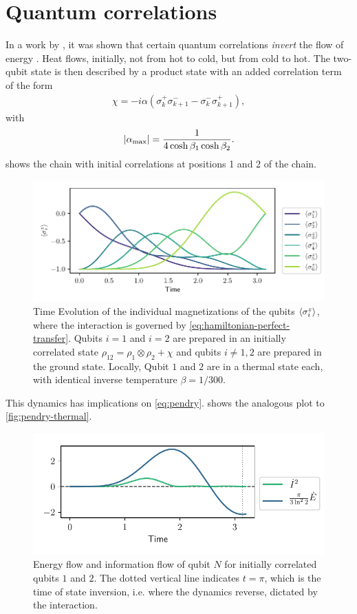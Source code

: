 \documentclass[a4paper,11pt]{scrartcl}
\begin{document}
\section{Quantum correlations}
In a work by \citeauthor{BA_kaonan_correlations}, it was shown that certain quantum correlations
\emph{invert} the flow of energy \cite{BA_kaonan_correlations}. Heat flows, initially, not from hot to cold, but
from cold to hot. The two-qubit state is then described by a product state with an added correlation term of the form
\begin{align}\label{eq:kaonans-corr}
    \chi = -i\alpha(\sigma^+_k \sigma^-_{k+1} - \sigma^-_k \sigma^+_{k+1}),
\end{align}
with 
\begin{align}\label{eq:alpha-max}
    \abs{\alpha_\text{max}} = \frac{1}{4\cosh\beta_1\cosh\beta_2}.
\end{align}
 shows the chain with initial correlations at positions 1 and 2 of the chain.
\begin{figure}[H]
    \centering
    \includegraphics{thermal-state-expval-z-corr.pdf}
    \caption{Time Evolution of the individual magnetizations of the qubits
    $\expval{\sigma^z_i}$, where the interaction is governed by \cref{eq:hamiltonian-perfect-transfer}.
    Qubits $i=1$ and $i=2$ are prepared in an initially correlated state $\rho_{12} = \rho_1 \otimes \rho_2 + \chi$
    and qubits $i\neq1,2$ are prepared in the ground state.
    Locally, Qubit $1$ and $2$ are in a thermal state each, with identical inverse temperature $\beta = 1/300$.}
    \label{fig:corr}
\end{figure}
This dynamics has implications on \cref{eq:pendry}.  shows the analogous plot to \cref{fig:pendry-thermal}.
\begin{figure}[H]
    \centering
    \includegraphics{12_penry_grey_lines_first_thermal.pdf}
    \caption{Energy flow  and information flow of qubit $N$ for 
    initially correlated qubits $1$ and $2$.
    The dotted vertical line indicates $t=\pi$, which is the time of state inversion, i.e. where the dynamics reverse,
    dictated by the interaction.}
    \label{fig:corr12_pendry}
\end{figure}
\end{document}

